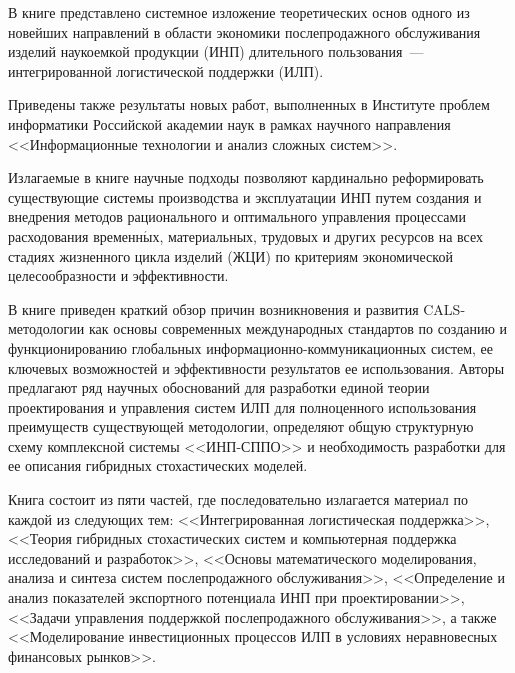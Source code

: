      \begin{multicols}{2}
     {\small
     {\baselineskip=10.1pt
     

      В книге представлено системное изложение теоретических основ одного из новейших 
направлений в \mbox{об\-ласти} экономики послепродажного обслуживания изделий наукоемкой 
продукции (ИНП) длительного пользования~--- интегрированной логистической поддержки
(ИЛП). 
{

}

Приведены также результаты новых работ, выполненных в Институте проблем информатики 
Российской академии наук в рамках научного направления <<Информационные технологии и 
анализ сложных сис\-тем>>.
 {%

}
     
      Излагаемые в книге научные подходы позво\-ляют карди\-наль\-но реформировать 
существующие системы производства и эксплуатации ИНП путем создания и внед\-ре\-ния 
методов рационального и оптимального управ\-ле\-ния процессами расходования 
вре\-мен\-н$\acute{\mbox{ы}}$х, 
мате\-ри\-аль\-ных, трудовых и других ресурсов на всех стадиях жизненного цикла изделий (ЖЦИ) по 
критериям экономической целесообразности и эф\-фек\-тив\-ности.
  {

}
    
      В книге приведен краткий обзор причин возник\-новения и
      развития CALS-методологии как основы 
современных международных стандартов по созданию и функционированию глобальных 
ин\-фор\-ма\-ци\-он\-но-ком\-му\-ни\-ка\-ци\-он\-ных систем, ее ключевых возможностей и эффективности 
результатов ее использования. 
Авторы %
предлагают ряд научных обоснований для разработки 
единой теории проектирования и управления систем ИЛП для полноценного использования 
преимуществ %
 суще\-ст\-ву\-ющей методологии, определяют \mbox{общую} структурную схему 
комплексной системы <<ИНП-СППО>> и необходимость разработки для ее описания 
гибридных стохастических моделей.
{%

}

      
      Книга состоит из пяти частей, где последовательно излагается материал по каждой из 
следующих тем: <<Интегрированная логистическая поддержка>>, <<Теория гибридных 
стохастических систем и компьютерная поддержка исследований и разработок>>, <<Основы 
математического моделирования, анализа и синтеза систем послепродажного обслуживания>>, 
<<Определение и анализ показателей экспортного потенциала ИНП при проектировании>>, 
<<Задачи управления поддержкой послепродажного обслуживания>>, а также 
<<Моделирование инвестиционных процессов ИЛП в условиях неравновесных финансовых 
рынков>>. 
   
}}
\end{multicols}
